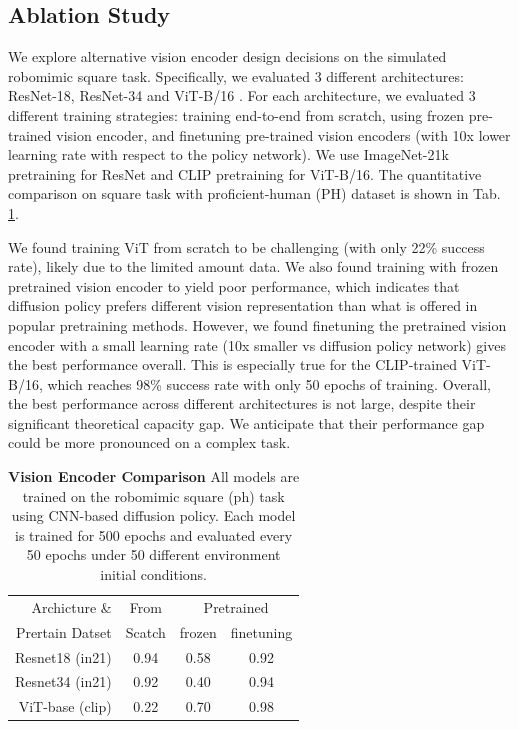 \subsection{Ablation Study}
\label{sec:arch_ablation}
We explore alternative vision encoder design decisions on the simulated robomimic square task.
Specifically, we evaluated 3 different architectures: 
ResNet-18, ResNet-34 \cite{resnet} 
and ViT-B/16 \cite{dosovitskiy2020image}. 
For each architecture, we evaluated 3 different training strategies:
training end-to-end from scratch,
using frozen pre-trained vision encoder, 
and finetuning pre-trained vision encoders (with 10x lower learning rate with respect to the policy network).
We use ImageNet-21k \cite{ridnik2021imagenet21k} pretraining for ResNet and CLIP \cite{radford2021learning} pretraining for ViT-B/16.
The quantitative comparison on square task with proficient-human (PH) dataset is shown in Tab. \ref{tab:ablation_vision_encorder}.

We found training ViT from scratch to be challenging (with only 22\% success rate), likely due to the limited amount data.
We also found training with frozen pretrained vision encoder to yield poor performance, which indicates that diffusion policy prefers different vision representation than what is offered in popular pretraining methods.
However, we found finetuning the pretrained vision encoder with a small learning rate (10x smaller vs diffusion policy network) gives the best performance overall. This is especially true for the CLIP-trained ViT-B/16, which reaches 98\% success rate with only 50 epochs of training.
Overall, the best performance across different architectures is not large, despite their significant theoretical capacity gap. We anticipate that their performance gap could be more pronounced on a complex task.

\begin{table}
\centering
\begin{tabular}{r|c|cc}
\toprule
Archicture \& & From & \multicolumn{2}{c}{Pretrained} \\
Prertain Datset& Scatch & frozen & finetuning \\
\midrule
Resnet18 (in21) & 0.94   & 0.58      & 0.92             \\
Resnet34 (in21)& 0.92   & 0.40      & 0.94             \\
ViT-base (clip)& 0.22   & 0.70      & 0.98             \\
\bottomrule
\end{tabular}
\caption{\textbf{Vision Encoder Comparison} All models are trained on the robomimic square (ph) task using CNN-based diffusion policy. Each model is trained for 500 epochs and evaluated every 50 epochs under 50 different environment initial conditions.}
\label{tab:ablation_vision_encorder} 
\vspace{-2mm}
\end{table}


